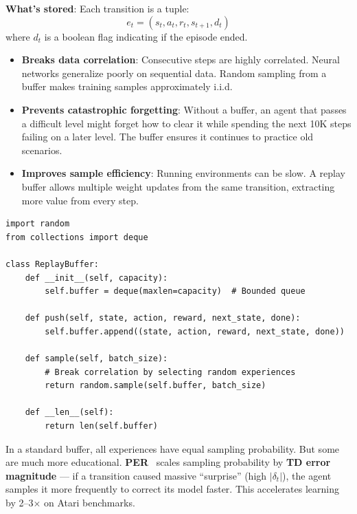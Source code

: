 \textbf{What’s stored}: Each transition is a tuple: 
\begin{equation}
e_t = (s_t, a_t, r_t, s_{t+1}, d_t)
\end{equation}
 where $d_t$ is a boolean flag indicating if the episode ended.

\begin{keybox}
\begin{itemize}
  \item \textbf{Breaks data correlation}: Consecutive steps are highly correlated. Neural networks generalize poorly on sequential data. Random sampling from a buffer makes training samples approximately i.i.d.
  \item \textbf{Prevents catastrophic forgetting}: Without a buffer, an agent that passes a difficult level might forget how to clear it while spending the next 10K steps failing on a later level. The buffer ensures it continues to practice old scenarios.
  \item \textbf{Improves sample efficiency}: Running environments can be slow. A replay buffer allows multiple weight updates from the same transition, extracting more value from every step.
\end{itemize}
\end{keybox}

\begin{lstlisting}[style=pythonstyle]
import random
from collections import deque

class ReplayBuffer:
    def __init__(self, capacity):
        self.buffer = deque(maxlen=capacity)  # Bounded queue
    
    def push(self, state, action, reward, next_state, done):
        self.buffer.append((state, action, reward, next_state, done))
        
    def sample(self, batch_size):
        # Break correlation by selecting random experiences
        return random.sample(self.buffer, batch_size)
        
    def __len__(self):
        return len(self.buffer)
\end{lstlisting}

\begin{intuitionbox}
In a standard buffer, all experiences have equal sampling probability. But some are much more educational. \textbf{PER}~\cite{schaul2016prioritized} scales sampling probability by \textbf{TD error magnitude} --- if a transition caused massive ``surprise'' (high $|\delta_t|$), the agent samples it more frequently to correct its model faster. This accelerates learning by 2--3$\times$ on Atari benchmarks.
\end{intuitionbox}


